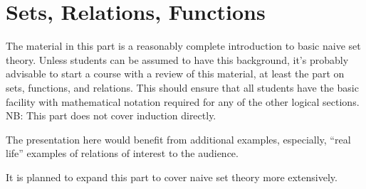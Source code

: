 \documentclass[../../include/open-logic-part]{subfiles}
\begin{document}
\part{Sets, Relations, Functions}

\begin{editorial}
  The material in this part is a reasonably complete introduction to
  basic naive set theory. Unless students can be assumed to have this
  background, it's probably advisable to start a course with a review
  of this material, at least the part on sets, functions, and
  relations. This should ensure that all students have the basic
  facility with mathematical notation required for any of the other
  logical sections. NB: This part does not cover induction directly.

  The presentation here would benefit from additional examples,
  especially, ``real life'' examples of relations of interest to the
  audience.

  It is planned to expand this part to cover naive set theory more
  extensively.
\end{editorial}





\OLEndPartHook
\end{document}
